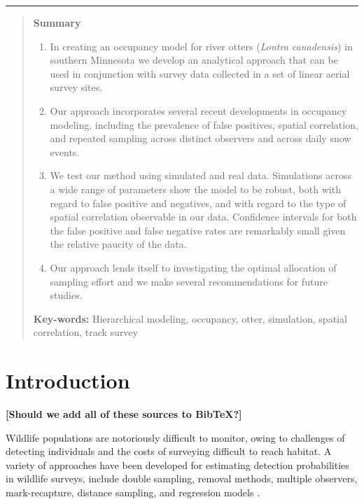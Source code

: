 \documentclass[11pt]{article}
\begin{document}
\normalsize\rm
\vspace{2ex}
\noindent
\rule{5in}{.4mm}

\vspace{3ex}
\begin{quote}
\noindent
{\bf Summary}
\begin{enumerate}
    \item In creating an occupancy model for river otters ({\em Lontra
        canadensis}) in southern Minnesota we develop an analytical approach
        that can be used in conjunction with survey data collected in a set of
        linear aerial survey sites.
    \item Our approach incorporates several recent developments in occupancy
        modeling, including the prevalence of false positives, spatial
        correlation, and repeated sampling across distinct observers and across
        daily snow events.
    \item We test our method using simulated and real data. Simulations across
        a wide range of parameters show the model to be robust, both with
        regard to false positive and negatives, and with regard to the type of
        spatial correlation observable in our data.  Confidence intervals for
        both the false positive and false negative rates are remarkably small
        given the relative paucity of the data.
    \item Our approach lends itself to investigating the optimal allocation of
        sampling effort and we make several recommendations for future studies.
\end{enumerate}

\vspace{2ex}
\noindent
{\bf Key-words:} Hierarchical modeling, occupancy, otter, simulation, spatial
correlation, track survey
\end{quote}

\normalsize
\section{Introduction}

\textbf{[Should we add all of these sources to BibTeX?]}

Wildlife populations are notoriously difficult to monitor, owing to challenges
of detecting individuals and the costs of surveying difficult to reach habitat.
A variety of approaches have been developed for estimating detection
probabilities in wildlife surveys, include double sampling, removal methods,
multiple observers, mark-recapture, distance sampling, and regression models
\citep{Lancia2005}.
\end{document}
